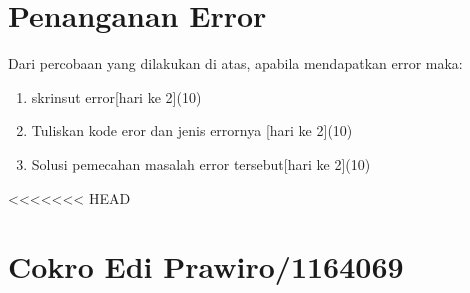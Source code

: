 \section{Penanganan Error}
Dari percobaan yang dilakukan di atas, apabila mendapatkan error maka:

\begin{enumerate}
	\item
	skrinsut error[hari ke 2](10)
	\item
Tuliskan kode eror dan jenis errornya [hari ke 2](10)
	\item
Solusi pemecahan masalah error tersebut[hari ke 2](10)

\end{enumerate}

<<<<<<< HEAD
\section{Cokro Edi Prawiro/1164069}
